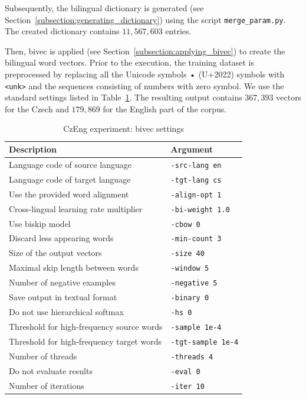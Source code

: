 Subsequently, the bilingual dictionary is generated (see Section~\ref{subsection:generating_dictionary}) using the script \texttt{merge\_param.py}. The created dictionary contains $11,567,603$ entries.

Then, bivec is applied (see Section~\ref{subsection:applying_bivec}) to create the bilingual word vectors. Prior to the execution, the training dataset is preprocessed by replacing all the Unicode symbols • (U+2022) symbols with \texttt{<unk>} and the sequences consisting of numbers with zero symbol. We use the standard settings listed in Table~\ref{table:czeng_bivec_settings}. The resulting output contains $367,393$ vectors for the Czech and $179,869$ for the English part of the corpus.
	
\begin{table}[!htb]
	\centering
	\caption{CzEng experiment: bivec settings}
	\label{table:czeng_bivec_settings}
	\vspace{1em}
	\begin{tabular}{|l|l|}
		\hline
		\textbf{Description} & \textbf{Argument}\\
		\hline
		Language code of source language & \texttt{-src-lang en}\\
		Language code of target language & \texttt{-tgt-lang cs}\\
		Use the provided word alignment & \texttt{-align-opt 1}\\
		Cross-lingual learning rate multiplier & \texttt{-bi-weight 1.0}\\
		Use biskip model & \texttt{-cbow 0}\\
		Discard less appearing words & \texttt{-min-count 3}\\
		Size of the output vectors & \texttt{-size 40}\\
		Maximal skip length between words & \texttt{-window 5}\\
		Number of negative examples & \texttt{-negative 5}\\
		Save output in textual format & \texttt{-binary 0}\\
		Do not use hierarchical softmax & \texttt{-hs 0}\\
		Threshold for high-frequency source words & \texttt{-sample 1e-4}\\
		Threshold for high-frequency target words & \texttt{-tgt-sample 1e-4}\\
		Number of threads & \texttt{-threads 4}\\
		Do not evaluate results & \texttt{-eval 0}\\
		Number of iterations & \texttt{-iter 10}\\
		\hline
	\end{tabular}
\end{table}

